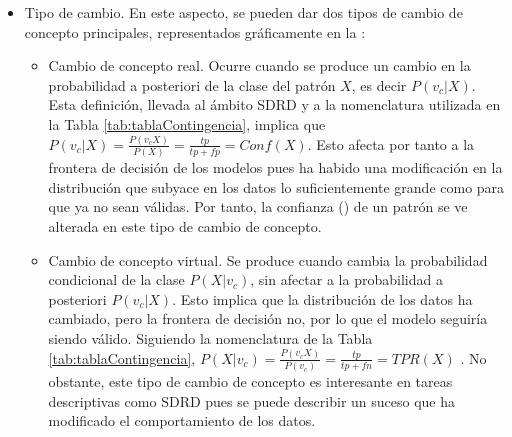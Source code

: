 \documentclass[c5paper,10pt,twoside]{book}	   	%
\begin{document}
\begin{itemize}
	\item Tipo de cambio. En este aspecto, se pueden dar dos tipos de cambio de concepto principales, representados gráficamente en la :
	
	\begin{itemize}
		\item Cambio de concepto real. Ocurre cuando se produce un cambio en la probabilidad a posteriori de la clase del patrón $X$, es decir $P\left(v_c|X\right)$. Esta definición, llevada al ámbito \ac{SDRD} y a la nomenclatura utilizada en la Tabla \ref{tab:tablaContingencia}, implica que $P\left(v_c|X\right) = \frac{P(v_cX)}{P(X)} = \frac{tp}{tp+fp} = Conf(X)$.
		Esto afecta por tanto a la frontera de decisión de los modelos pues ha habido una modificación en la distribución que subyace en los datos lo suficientemente grande como para que ya no sean válidas. Por tanto, la confianza () de un patrón se ve alterada en este tipo de cambio de concepto.
		
		\item Cambio de concepto virtual. Se produce cuando cambia la probabilidad condicional de la clase $P\left(X|v_c\right)$, sin afectar a la probabilidad a posteriori $P\left(v_c|X\right)$. Esto implica que la distribución de los datos ha cambiado, pero la frontera de decisión no, por lo que el modelo seguiría siendo válido. Siguiendo la nomenclatura de la Tabla \ref{tab:tablaContingencia}, $P\left(X|v_c\right) = \frac{P(v_cX)}{P(v_c)} = \frac{tp}{tp+fn} = TPR(X)$ . No obstante, este tipo de cambio de concepto es interesante en tareas descriptivas como \ac{SDRD} pues se puede describir un suceso que ha modificado el comportamiento de los datos.
		
\end{itemize}


\end{itemize}
\end{document}
